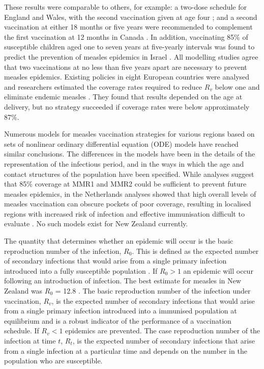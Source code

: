 \documentclass{article}
\begin{document}
These results were comparable to others, for example: a two-dose schedule for England and Wales, with the second vaccination given at age four \citep{babad95}; and a second vaccination at either 18 months or five years were recommended to complement the first vaccination at 12 months in Canada \citep{gay98}. In addition, vaccinating 85\% of susceptible children aged one to seven years at five-yearly intervals was found to predict the prevention of measles epidemics in Israel \citep{agur93}. All modelling studies agree that two vaccinations at no less than five years apart are necessary to prevent measles epidemics. Existing policies in eight European countries were analysed and researchers estimated the coverage rates required to reduce $R_v$ below one and eliminate endemic measles \citep{wallinga1}. They found that results depended on the age at delivery, but no strategy succeeded if coverage rates were below approximately 87\%.

Numerous models for measles vaccination strategies for various regions \citep{agur93, babad95, edmunds0, gay98, wallinga1} based on sets of nonlinear ordinary differential equation (ODE) models have reached similar conclusions. The differences in the models have been in the details of the representation of the infectious period, and in the ways in which the age and contact structures of the population have been specified. While analyses suggest that 85\% coverage at MMR1 and MMR2 could be sufficient to prevent future measles epidemics, in the Netherlands analyses showed that high overall levels of measles vaccination can obscure pockets of poor coverage, resulting in localised regions with increased risk of infection and effective immunisation difficult to evaluate \citep{glass4}. No such models exist for New Zealand currently.

The quantity that determines whether an epidemic will occur is the basic reproduction number of the infection, $R_0$. This is defined as the expected number of secondary infections that would arise from a single primary infection introduced into a fully susceptible population \citep{anderson91, diekmann13}. If $R_0 > 1$ an epidemic will occur following an introduction of infection. The best estimate for measles in New Zealand was $R_0$ = 12.8 \citep{roberts4}. The basic reproduction number of the infection under vaccination, $R_v$, is the expected number of secondary infections that would arise from a single primary infection introduced into a immunised population at equilibrium and is a robust indicator of the performance of a vaccination schedule. If $R_v < 1$ epidemics are prevented. The case reproduction number of the infection at time $t$, $R_t$, is the expected number of secondary infections that arise from a single infection at a particular time and depends on the number in the population who are susceptible.
\end{document}
